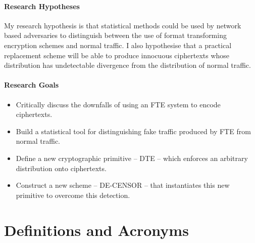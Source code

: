 \documentclass[ %
                    author={Samuel Russell},
                supervisor={Prof. Bogdan Warinschi},
                    degree={MEng},
                     title={Innocuous Ciphertexts},
                  subtitle={The DE-CENSOR Scheme},
                      type={Research},
                      year={2018} ]{dissertation}
\begin{document}
\subsubsection{Research Hypotheses}

My research hypothesis is that statistical methods could be used by network based adversaries to distinguish between the use of format transforming encryption schemes and normal traffic. I also hypothesise that a practical replacement scheme will be able to produce innocuous ciphertexts whose distribution has undetectable divergence from the distribution of normal traffic.

\subsubsection{Research Goals}

\begin{itemize}
\item Critically discuss the downfalls of using an FTE system to encode ciphertexts.
\item Build a statistical tool for distinguishing fake traffic produced by FTE from normal traffic.
\item Define a new cryptographic primitive -- DTE -- which enforces an arbitrary distribution onto ciphertexts.
\item Construct a new scheme -- DE-CENSOR -- that instantiates this new primitive to overcome this detection.
\end{itemize}


\chapter{Definitions and Acronyms}

\vspace{1cm}
\end{document}
